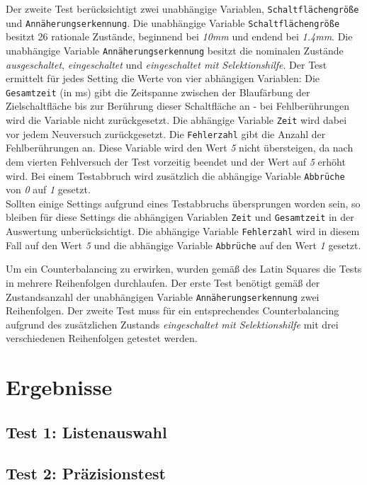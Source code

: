 \documentclass[a4paper,12pt,bibliography=totoc]{scrreprt}%
\begin{document}
Der zweite Test berücksichtigt zwei unabhängige Variablen, {\tt Schaltflächengröße} und {\tt Annäherungserkennung}. Die unabhängige Variable {\tt Schaltflächengröße} besitzt 26 rationale Zustände, beginnend bei \emph{10mm} und endend bei \emph{1.4mm}. Die unabhängige Variable {\tt Annäherungserkennung} besitzt die nominalen Zustände \emph{ausgeschaltet}, \emph{eingeschaltet} und \emph{eingeschaltet mit Selektionshilfe}. Der Test ermittelt für jedes Setting die Werte von vier abhängigen Variablen: Die {\tt Gesamtzeit} (in ms) gibt die Zeitspanne zwischen der Blaufärbung der Zielschaltfläche bis zur Berührung dieser Schaltfläche an - bei Fehlberührungen wird die Variable nicht zurückgesetzt. Die abhängige Variable {\tt Zeit} wird dabei vor jedem Neuversuch zurückgesetzt. Die {\tt Fehlerzahl} gibt die Anzahl der Fehlberührungen an. Diese Variable wird den Wert \emph{5} nicht übersteigen, da nach dem vierten Fehlversuch der Test vorzeitig beendet und der Wert auf \emph{5} erhöht wird. Bei einem Testabbruch wird zusätzlich die abhängige Variable {\tt Abbrüche} von \emph{0} auf \emph{1} gesetzt.\\
Sollten einige Settings aufgrund eines Testabbruchs übersprungen worden sein, so bleiben für diese Settings die abhängigen Variablen {\tt Zeit} und {\tt Gesamtzeit} in der Auswertung unberücksichtigt. Die abhängige Variable {\tt Fehlerzahl} wird in diesem Fall auf den Wert \emph{5} und die abhängige Variable {\tt Abbrüche} auf den Wert \emph{1} gesetzt.

Um ein Counterbalancing zu erwirken, wurden gemäß des Latin Squares die Tests in mehrere Reihenfolgen durchlaufen. Der erste Test benötigt gemäß der Zustandsanzahl der unabhängigen Variable {\tt Annäherungserkennung} zwei Reihenfolgen. Der zweite Test muss für ein entsprechendes Counterbalancing aufgrund des zusätzlichen Zustands \emph{eingeschaltet mit Selektionshilfe} mit drei verschiedenen Reihenfolgen getestet werden.

\chapter{Ergebnisse}


\section{Test 1: Listenauswahl}


\section{Test 2: Präzisionstest}
\end{document}
